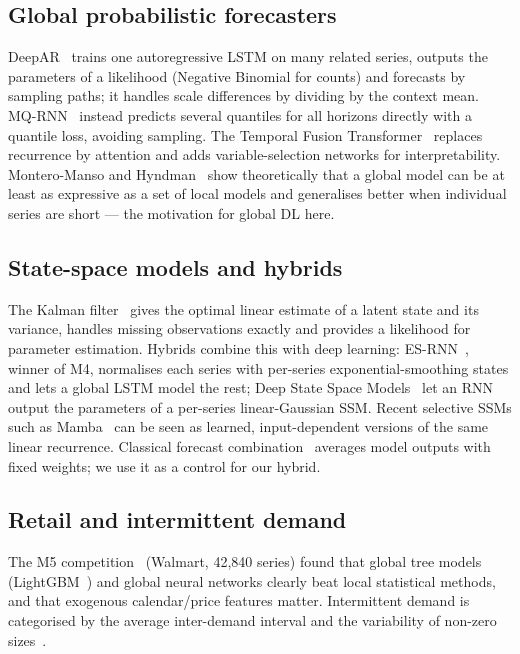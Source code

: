 \documentclass[conference]{IEEEtran}
\begin{document}
\subsection{Global probabilistic forecasters}
DeepAR~\cite{salinas2020deepar} trains one autoregressive LSTM on many related series, outputs the parameters of a likelihood
(Negative Binomial for counts) and forecasts by sampling paths; it handles scale differences by dividing by the context mean.
MQ-RNN~\cite{wen2017mqrnn} instead predicts several quantiles for all horizons directly with a quantile loss, avoiding sampling.
The Temporal Fusion Transformer~\cite{lim2021tft} replaces recurrence by attention and adds variable-selection networks for
interpretability. Montero-Manso and Hyndman~\cite{montero2021locality} show theoretically that a global model can be at least as
expressive as a set of local models and generalises better when individual series are short --- the motivation for global DL here.

\subsection{State-space models and hybrids}
The Kalman filter~\cite{kalman1960,durbin2012ssm} gives the optimal linear estimate of a latent state and its variance, handles missing
observations exactly and provides a likelihood for parameter estimation. Hybrids combine this with deep learning: ES-RNN~\cite{smyl2020esrnn},
winner of M4, normalises each series with per-series exponential-smoothing states and lets a global LSTM model the rest;
Deep State Space Models~\cite{rangapuram2018dssm} let an RNN output the parameters of a per-series linear-Gaussian SSM.
Recent selective SSMs such as Mamba~\cite{gu2023mamba} can be seen as learned, input-dependent versions of the same linear recurrence.
Classical forecast combination~\cite{bates1969combination} averages model outputs with fixed weights; we use it as a control for our hybrid.

\subsection{Retail and intermittent demand}
The M5 competition~\cite{makridakis2022m5} (Walmart, 42{,}840 series) found that global tree models (LightGBM~\cite{ke2017lightgbm})
and global neural networks clearly beat local statistical methods, and that exogenous calendar/price features matter.
Intermittent demand is categorised by the average inter-demand interval and the variability of non-zero sizes~\cite{syntetos2005categorization}.
\end{document}
